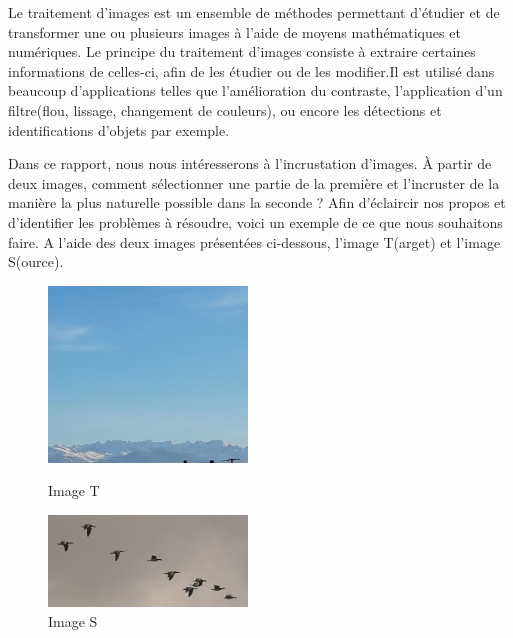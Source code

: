 
Le traitement d'images est un ensemble de méthodes permettant d'étudier et de transformer une ou plusieurs images à l'aide de moyens mathématiques et numériques. Le principe du traitement d'images consiste à extraire certaines informations de celles-ci, afin de les étudier ou de les modifier.Il est utilisé dans beaucoup d'applications telles que l'amélioration du contraste, l'application d'un filtre(flou, lissage, changement de couleurs), ou encore les détections et identifications d'objets par exemple. 

Dans ce rapport, nous nous intéresserons à l'incrustation d'images. À partir de deux images, comment sélectionner une partie de la première et l'incruster de la manière la plus naturelle possible dans la seconde ? 
\newline
Afin d'éclaircir nos propos et d'identifier les problèmes à résoudre, voici un exemple de ce que nous souhaitons faire.\newline
A l'aide des deux images présentées ci-dessous, l'image T(arget) et l'image S(ource). 
\newline
\begin{figure}[!htb]
   \begin{minipage}{0.48\textwidth}
     \centering
     \includegraphics[width = 150pt]{Images/Montagne.jpg}
     \caption{Image T}
      \end{minipage}\hfill
   \begin{minipage}{0.48\textwidth}
     \centering
     \includegraphics[width= 150pt]{Images/Oiseau.jpg}
     \caption{Image S}\label{Fig:Data2}
   \end{minipage}
\end{figure}

